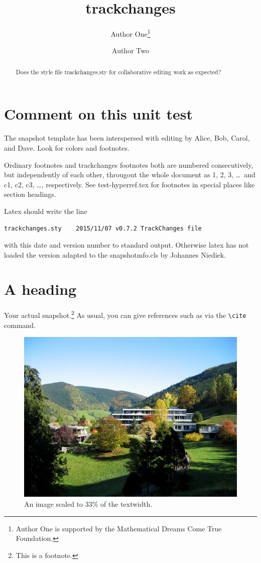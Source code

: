 \documentclass{snapshotmfo}
\author{Author One\thanks{Author One is supported by the Mathematical Dreams Come True Foundation.} \and Author Two}
\title{trackchanges}
\begin{document}
\begin{abstract}
Does the style file trackchanges.sty for collaborative editing work as expected?
\end{abstract}

\section{Comment on this unit test}
The snapshot template has been interspersed with editing by Alice, Bob, Carol, and Dave. Look for colors and footnotes.

Ordinary footnotes and trackchanges footnotes both are numbered consecutively, but independently of each other,
througout the whole document as 1, 2, 3, \dots\ and c1, c2, c3, \dots, respectively.
See test-hyperref.tex for footnotes in special places like section headings.

Latex should write the line
\begin{verbatim}
trackchanges.sty    2015/11/07 v0.7.2 TrackChanges file 
\end{verbatim}
with this date and version number to standard output. Otherwise latex has not loaded the version
adapted to the snapshotmfo.cls by Johannes Niediek.

\section{A heading}
Your actual snapshot.\footnote{This is a footnote.} As usual, you can give references such as \cite{snapshot, knuth1984texbook, wikiMath, sample13, sample12, sample11, sample14} via the \verb+\cite+ command.


\begin{figure}[ht]
        \centering 
        \includegraphics[width= 0.33 \textwidth]{mfo.jpg}
        \caption{An image scaled to 33\% of the textwidth.}
\label{fig:sample-image}
\end{figure}
\end{document}
